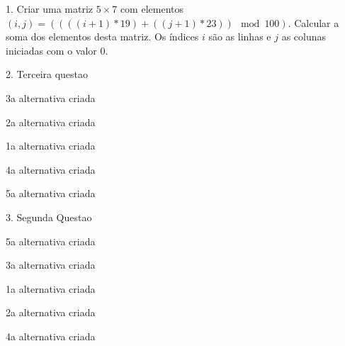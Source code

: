 \documentclass[11pt,brazil,a4paper]{exam}
\begin{document}
 \hspace{0mm} 1. Criar uma matriz \( 5 \times 7 \) com elementos 
\( (i,j) = ((((i+1) * 19) + ( ( j+1) * 23)) \mod{100}) \). 
Calcular a soma dos elementos desta matriz. Os índices \(i\) são as linhas
e \(j\) as colunas iniciadas com o valor \(0\).

\vspace{0mm}

\begin{oneparchoices}






\end{oneparchoices}\vspace{1mm}



 \hspace{0mm} 2. Terceira questao\vspace{0mm}

\begin{oneparchoices}

\choice 3a alternativa criada

\choice 2a alternativa criada

\choice 1a alternativa criada

\choice 4a alternativa criada

\choice 5a alternativa criada
\end{oneparchoices}\vspace{1mm}



 \hspace{0mm} 3. Segunda Questao\vspace{0mm}

\begin{oneparchoices}

\choice 5a alternativa criada

\choice 3a alternativa criada

\choice 1a alternativa criada

\choice 2a alternativa criada

\choice 4a alternativa criada
\end{oneparchoices}\vspace{1mm}
\end{document}
